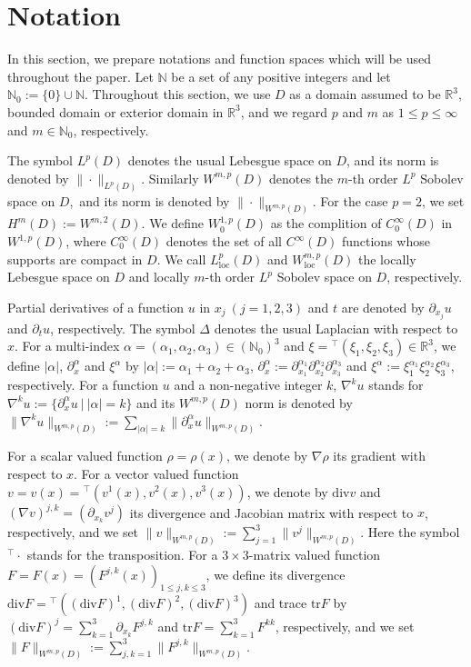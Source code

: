 \documentclass[dvipdfmx,12pt]{article}
\begin{document}
\section{Notation}
In this section, we prepare notations and function spaces which will be used throughout the paper. Let $\mathbb{N}$ be a set of any positive integers and let $\mathbb{N}_0:=\{0\}\cup \mathbb{N}$. Throughout this section, we use $D$ as a domain assumed to be $\mathbb{R}^3$, bounded domain or exterior domain in $\mathbb{R}^3$, and we regard $p$ and $m$ as $1\leq p\leq \infty$ and $m\in\mathbb{N}_0$, respectively.


The symbol $L^p(D)$ denotes the usual Lebesgue space on $D$, and its norm is denoted by $\|\cdot\|_{L^p(D)}$. 
Similarly $W^{m,p}(D)$ denotes the $m$-th order $L^p$ Sobolev space on $D$,~and its norm is denoted by $\|\cdot\|_{W^{m,p}(D)}$.  For the case $p=2$, we set $H^m(D):=W^{m,2}(D)$. 
We define $W_0^{1,p}(D)$ as the complition of $C_0^\infty(D)$ in $W^{1,p}(D)$, where $C_0^\infty(D)$ denotes the set of all $C^\infty (D)$ functions whose supports are compact in $D$. We call $L_{\mathrm{loc}}^p(D)$ and $W_{\mathrm{loc}}^{m,p}(D)$ the locally Lebesgue space on $D$ and locally $m$-th order $L^p$ Sobolev space on $D$, respectively. 



Partial derivatives of a function $u$ in $x_j~(j=1,2,3)$ and $t$ are denoted by $\partial_{x_j}u$ and $\partial_t u$, respectively. The symbol $\Delta$ denotes the usual Laplacian with respect to $x$. For  a multi-index $\alpha=(\alpha_1,\alpha_2,\alpha_3)\in(\mathbb{N}_0)^3$ and $\xi={}^\top(\xi_1,\xi_2,\xi_3)\in\mathbb{R}^3$, we define $|\alpha|$, $\partial_x^\alpha$ and $\xi^\alpha$ by $|\alpha|:=\alpha_1+\alpha_2+\alpha_3$, $\partial_x^\alpha :=\partial_{x_1}^{\alpha_1} \partial_{x_2}^{\alpha_2} \partial_{x_3}^{\alpha_3}$ and $\xi^\alpha:=\xi_1^{\alpha_1}\xi_2^{\alpha_2}\xi_3^{\alpha_3}$, respectively. For a function $u$ and a non-negative integer $k$, $\nabla^k u$ stands for $\nabla^k u:=\{\partial_x^\alpha u~|~|\alpha|=k\}$ and its $W^{m,p}(D)$ norm is denoted by $\|\nabla^k u\|_{W^{m,p}(D)}:=\sum_{|\alpha|=k}\|\partial_x^\alpha u\|_{W^{m,p}(D)}$.



For a scalar valued function $\rho=\rho(x)$, we denote by $\nabla\rho$ its gradient with respect to $x$. For a vector valued function $v=v(x)={}^\top(v^1(x),v^2(x),v^3(x))$, we denote by $\mathrm{div}v$ and $(\nabla v)^{j,k}=(\partial_{x_k}v^j)$ its divergence and Jacobian matrix with respect to $x$, respectively, and we set $\|v\|_{W^{m,p}(D)}:=\sum_{j=1}^3\|v^j\|_{W^{m,p}(D)}$. Here the symbol ${}^\top\cdot$ stands for the transposition. For a $3\times3$-matrix valued function $F=F(x)=(F^{j,k}(x))_{1\le j,k\le 3}$, we define its divergence $\mathrm{div}F={}^\top((\mathrm{div}F)^1,(\mathrm{div}F)^2,(\mathrm{div}F)^3)$ and trace $\mathrm{tr}F$ by $(\mathrm{div}F)^j=\sum_{k=1}^3 \partial_{x_k}F^{j,k}$ and $\mathrm{tr}F=\sum_{k=1}^3 F^{kk}$, respectively, and we set $\|F\|_{W^{m,p}(D)}:=\sum_{j,k=1}^3\|F^{j,k}\|_{W^{m,p}(D)}$. 
\end{document}
